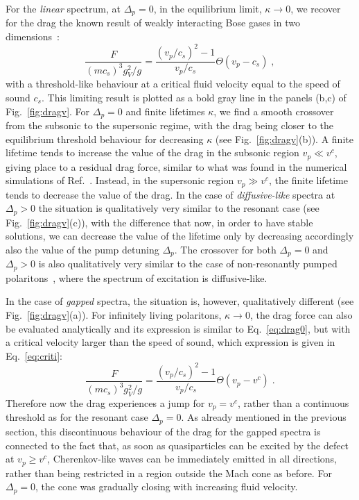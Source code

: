 For the \emph{linear} spectrum, at $\Delta_p=0$, in the equilibrium
limit, $\kappa \to 0$, we recover for the drag the known result of
weakly interacting Bose gases in two
dimensions~\cite{Astrakharchik_2004}:
%
\begin{equation}
  \frac{F}{(mc_s)^3 g_V^2/g}=\frac{(v_p/c_s)^2 - 1}{v_p/c_s}
  \Theta(v_p - c_s)\; ,
\label{eq:drag0}
\end{equation}
%
with a threshold-like behaviour at a critical fluid velocity equal to
the speed of sound $c_s$. This limiting result is plotted as a bold
gray line in the panels (b,c) of Fig.~\ref{fig:dragv}. For
$\Delta_p=0$ and finite lifetimes $\kappa$, we find a smooth crossover
from the subsonic to the supersonic regime, with the drag being closer
to the equilibrium threshold behaviour for decreasing $\kappa$ (see
Fig.~\ref{fig:dragv}(b)). A finite lifetime tends to increase the
value of the drag in the subsonic region $v_p \ll v^c$, giving place
to a residual drag force, similar to what was found in the numerical
simulations of Ref.~\cite{Cancellieri_2010}. Instead, in the supersonic
region $v_p \gg v^c$, the finite lifetime tends to decrease the value
of the drag. In the case of \emph{diffusive-like} spectra at
$\Delta_p>0$ the situation is qualitatively very similar to the
resonant case (see Fig.~\ref{fig:dragv}(c)), with the difference that
now, in order to have stable solutions, we can decrease the value of
the lifetime only by decreasing accordingly also the value of the pump
detuning $\Delta_p$. The crossover for both $\Delta_p = 0$ and
$\Delta_p > 0$ is also qualitatively very similar to the case of
non-resonantly pumped polaritons~\cite{Wouters_2010}, where the
spectrum of excitation is diffusive-like.

In the case of \emph{gapped} spectra, the situation is, however,
qualitatively different (see Fig.~\ref{fig:dragv}(a)). For infinitely
living polaritons, $\kappa \to 0$, the drag force can also be
evaluated analytically and its expression is similar to
Eq.~\eqref{eq:drag0}, but with a critical velocity larger than the
speed of sound, which expression is given in Eq.~\eqref{eq:criti}:
%
\begin{equation}
  \frac{F}{(mc_s)^3 g_V^2/g}=\frac{(v_p/c_s)^2 - 1}{v_p/c_s}
  \Theta(v_p - v^c)\; .
\end{equation}
%
Therefore now the drag experiences a jump for $v_p=v^c$, rather than a
continuous threshold as for the resonant case $\Delta_p=0$. As already
mentioned in the previous section, this discontinuous behaviour of the
drag for the gapped spectra is connected to the fact that, as soon as
quasiparticles can be excited by the defect at $v_p\ge v^c$,
Cherenkov-like waves can be immediately emitted in all directions,
rather than being restricted in a region outside the Mach cone as
before. For $\Delta_p=0$, the cone was gradually closing with
increasing  fluid velocity.

